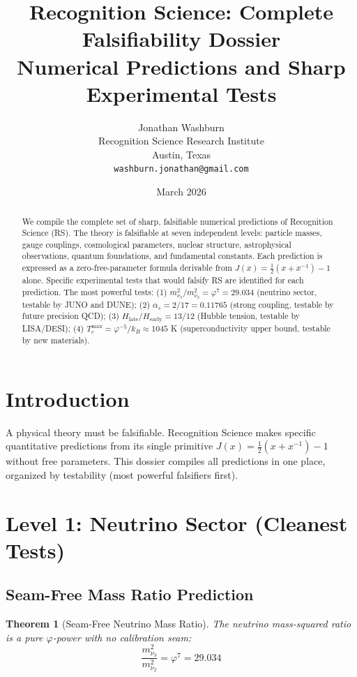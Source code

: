 \documentclass[12pt,a4paper]{article}
\title{Recognition Science: Complete Falsifiability Dossier\\
Numerical Predictions and Sharp Experimental Tests}
\author{Jonathan Washburn\\
Recognition Science Research Institute\\
Austin, Texas\\
\texttt{washburn.jonathan@gmail.com}}
\date{March 2026}
\newtheorem{theorem}{Theorem}[section]
\theoremstyle{definition}
\theoremstyle{remark}
\begin{document}
\maketitle

\begin{abstract}
We compile the complete set of sharp, falsifiable numerical predictions of Recognition 
Science (RS). The theory is falsifiable at seven independent levels: particle masses, 
gauge couplings, cosmological parameters, nuclear structure, astrophysical observations, 
quantum foundations, and fundamental constants. Each prediction is expressed as a 
zero-free-parameter formula derivable from $J(x) = \frac{1}{2}(x + x^{-1}) - 1$ alone. 
Specific experimental tests that would falsify RS are identified for each prediction.
The most powerful tests: (1) $m_{\nu_3}^2/m_{\nu_2}^2 = \varphi^7 = 29.034$ (neutrino 
sector, testable by JUNO and DUNE); (2) $\alpha_s = 2/17 = 0.11765$ (strong coupling, 
testable by future precision QCD); (3) $H_\mathrm{late}/H_\mathrm{early} = 13/12$ 
(Hubble tension, testable by LISA/DESI); (4) $T_c^\mathrm{max} = \varphi^{-5}/k_B \approx 1045$ K 
(superconductivity upper bound, testable by new materials).
\end{abstract}

\section{Introduction}

A physical theory must be falsifiable. Recognition Science makes specific quantitative 
predictions from its single primitive $J(x) = \frac{1}{2}(x + x^{-1}) - 1$ without 
free parameters. This dossier compiles all predictions in one place, organized by 
testability (most powerful falsifiers first).

\section{Level 1: Neutrino Sector (Cleanest Tests)}

\subsection{Seam-Free Mass Ratio Prediction}

\begin{theorem}[Seam-Free Neutrino Mass Ratio]
The neutrino mass-squared ratio is a pure $\varphi$-power with no calibration seam:
\begin{equation}
\boxed{\frac{m_{\nu_3}^2}{m_{\nu_2}^2} = \varphi^7 = 29.034}
\end{equation}
\end{theorem}
\end{document}
